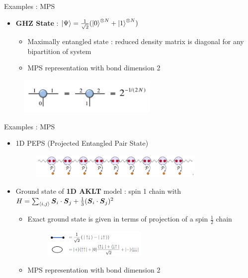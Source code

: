\documentclass{beamer}
\begin{document}
\begin{frame}{Examples : MPS}
\begin{itemize}
	\item \textbf{GHZ State} : ${ \ket{\Psi }=\frac{1}{\sqrt{2}}(\ket{0}^{\otimes N}+\ket{1}^{\otimes N}) }$
		\begin{itemize}
		\item Maximally entangled state : reduced density matrix is diagonal for any bipartition of system
		\item MPS representation with bond dimension 2
		\end{itemize}
	\end{itemize}
	\begin{figure}[h]
	\includegraphics[width=0.6\textwidth]{ghz}
	\centering
	\end{figure}
	
\end{frame}

\begin{frame}{Examples : MPS}
	\begin{itemize}
		\item 1D PEPS (Projected Entangled Pair State)
			\begin{figure}[h]
			\includegraphics[width=0.8\textwidth]{peps1d}
			\centering
			\end{figure}
			
	\item Ground state of \textbf{1D AKLT} model : spin 1 chain with ${ H=\sum_{\ev{i,j}}^{} \boldsymbol{S}_{i}\cdot \boldsymbol{S}_{j}+ \frac{1}{3}(\boldsymbol{S}_{i}\cdot \boldsymbol{S}_{j})^{2} }$
		\begin{itemize}
		\item Exact ground state is given in terms of projection of a spin ${ \frac{1}{2} }$ chain
			\begin{figure}[h]
			\includegraphics[width=0.5\textwidth]{aklt}
			\centering
			\end{figure}
			
		\item MPS representation with bond dimension 2
		\end{itemize}
	\end{itemize}
\end{frame}
\end{document}

